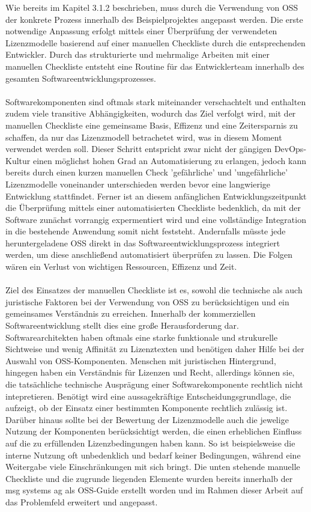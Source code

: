 Wie bereits im Kapitel 3.1.2 beschrieben, muss durch die Verwendung von OSS der konkrete Prozess innerhalb des Beispielprojektes angepasst werden. Die erste notwendige Anpassung erfolgt mittels einer Überprüfung der verwendeten Lizenzmodelle basierend auf einer manuellen Checkliste durch die entsprechenden Entwickler. Durch das strukturierte und mehrmalige Arbeiten mit einer manuellen Checkliste entsteht eine Routine für das Entwicklerteam innerhalb des gesamten Softwareentwicklungsprozesses.\\\\ Softwarekomponenten sind oftmals stark miteinander verschachtelt und enthalten zudem viele transitive Abhängigkeiten, wodurch das Ziel verfolgt wird, mit der manuellen Checkliste eine gemeinsame Basis, Effizenz und eine Zeitersparnis zu schaffen, da nur das Lizenzmodell betrachetet wird, was in diesem Moment verwendet werden soll. Dieser Schritt entspricht zwar nicht der gängigen DevOps-Kultur einen möglichst hohen Grad an Automatisierung zu erlangen, jedoch kann bereits durch einen kurzen manuellen Check 'gefährliche' und 'ungefährliche' Lizenzmodelle voneinander unterschieden werden bevor eine langwierige Entwicklung stattfindet. Ferner ist an diesem anfänglichen Entwicklungszeitpunkt die Überprüfung mittels einer automatisierten Checkliste bedenklich, da mit der Software zunächst vorrangig expermentiert wird und eine vollständige Integration in die bestehende Anwendung somit nicht feststeht. Andernfalls müsste jede heruntergeladene OSS direkt in das Softwareentwicklungsprozess integriert werden, um diese anschließend automatisiert überprüfen zu lassen. Die Folgen wären ein Verlust von wichtigen Ressourcen, Effizenz und Zeit.\\\\ Ziel des Einsatzes der manuellen Checkliste ist es, sowohl die technische als auch juristische Faktoren bei der Verwendung von OSS zu berücksichtigen und ein gemeinsames Verständnis zu erreichen. Innerhalb der kommerziellen Softwareentwicklung stellt dies eine große Herausforderung dar. Softwarearchitekten haben oftmals eine starke funktionale und strukurelle Sichtweise und wenig Affinität zu Lizenztexten und benötigen daher Hilfe bei der Auswahl von OSS-Komponenten. Menschen mit juristischen Hintergrund,  hingegen haben ein Verständnis für Lizenzen und Recht, allerdings können sie, die tatsächliche technische Ausprägung einer Softwarekomponente rechtlich nicht intepretieren. Benötigt wird eine aussagekräftige Entscheidungsgrundlage, die aufzeigt, ob der Einsatz einer bestimmten Komponente rechtlich zulässig ist. Darüber hinaus sollte bei der Bewertung der Lizenzmodelle auch die jewelige Nutzung der Komponenten berücksichtigt werden, die einen erheblichen Einfluss auf die zu erfüllenden Lizenzbedingungen haben kann. So ist beispielsweise die interne Nutzung oft unbedenklich und bedarf keiner Bedingungen, während eine Weitergabe viele Einschränkungen mit sich bringt. Die unten stehende manuelle Checkliste und die zugrunde liegenden Elemente wurden bereits innerhalb der msg systems ag als OSS-Guide erstellt worden und im Rahmen dieser Arbeit auf das Problemfeld erweitert und angepasst.

